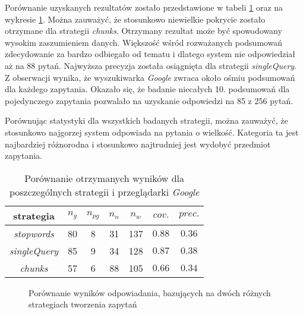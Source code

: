 Porównanie uzyskanych rezultatów zostało przedstawione w tabeli \ref{tab:porownanieStrat} oraz na wykresie \ref{fig:porownanie-strategie}. Można zauważyć, że stosunkowo niewielkie pokrycie zostało otrzymane dla strategii \textit{chunks}. Otrzymany rezultat może być spowodowany wysokim zaszumieniem danych. Większość wśród rozważanych podsumowań zdecydowanie za bardzo odbiegało od tematu i dlatego system nie odpowiedział aż na 88 pytań. Najwyższa precyzja została osiągnięta dla strategii \textit{singleQuery}. Z obserwacji wynika, że wyszukiwarka \textit{Google} zwraca około ośmiu podsumowań dla każdego zapytania. Okazało się, że badanie niecałych 10. podsumowań dla pojedynczego zapytania pozwalało na uzyskanie odpowiedzi na 85 z 256 pytań. 

Porównując statystyki dla wszystkich badanych strategii, można zauważyć, że stosunkowo najgorzej system odpowiada na pytania o wielkość. Kategoria ta jest najbardziej różnorodna i stosunkowo najtrudniej jest wydobyć przedmiot zapytania.


\begin{table}[h]
	\centering
	\begin{tabular}{|c|c|c|c|c|c|c| }
		
		\hline
		\textbf{strategia} & $n_g$ &$n_{pg}$&$n_n$&$n_w$&$cov.$&$prec.$  \\ \hline
		\textit{stopwords}&80&8&31&137&$\num{0.88}$&$\num{0.36}$ \\ \hline
		\textit{singleQuery}&85&9&34&128&$\num{0.87}$&$\num{0.38}$ \\ \hline
		\textit{chunks}&57&6&88&105&$\num{0.66}$&$\num{0.34}$ \\ \hline
	\end{tabular}
	\caption{Porównanie otrzymanych wyników dla poszczególnych strategii i przeglądarki \textit{Google}}
	
	\label{tab:porownanieStrat}
	
\end{table}

\begin{figure}
	
	\caption{Porównanie wyników odpowiadania, bazujących na dwóch różnych strategiach tworzenia zapytań} \label{fig:porownanie-strategie}
\end{figure}


